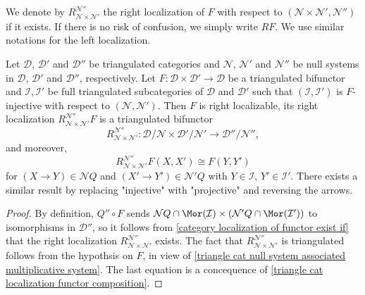 We denote by $R_{\mathcal{N}\times\mathcal{N}'}^{\mathcal{N}''}$ the right localization of $F$ with respect to $(\mathcal{N}\times\mathcal{N}',\mathcal{N}'')$ if it exists. If there is no risk of confusion, we simply write $RF$. We use similar notations for the left localization.

\begin{proposition}\label{triangle cat localization bifunctor exists if}
Let $\mathcal{D}$, $\mathcal{D}'$ and $\mathcal{D}''$ be triangulated categories and $\mathcal{N}$, $\mathcal{N}'$ and $\mathcal{N}''$ be null systems in $\mathcal{D}$, $\mathcal{D}'$ and $\mathcal{D}''$, respectively. Let $F:\mathcal{D}\times\mathcal{D}'\to\mathcal{D}$ be a triangulated bifunctor and $\mathcal{I},\mathcal{I}'$ be full triangulated subcategories of $\mathcal{D}$ and $\mathcal{D}'$ such that $(\mathcal{I},\mathcal{I}')$ is $F$-injective with respect to $(\mathcal{N},\mathcal{N}')$. Then $F$ is right localizable, its right localization $R_{\mathcal{N}\times\mathcal{N}'}^{\mathcal{N}''}F$ is a triangulated bifunctor 
\[R_{\mathcal{N}\times\mathcal{N}'}^{\mathcal{N}''}:\mathcal{D}/\mathcal{N}\times\mathcal{D}'/\mathcal{N}'\to\mathcal{D}''/\mathcal{N}'',\]
and moreover,
\begin{equation}\label{triangle cat localization bifunctor exists if-1}
R_{\mathcal{N}\times\mathcal{N}'}^{\mathcal{N}''}F(X,X')\cong F(Y,Y')
\end{equation}
for $(X\to Y)\in\mathcal{N}Q$ and $(X'\to Y')\in\mathcal{N}'Q$ with $Y\in\mathcal{I}$, $Y'\in\mathcal{I}'$. There exists a similar result by replacing "injective" with "projective" and reversing the arrows.
\end{proposition}
\begin{proof}
By definition, $Q''\circ F$ sends $\mathcal{N}Q\cap\Mor(\mathcal{I})\times(\mathcal{N}'Q\cap\Mor(\mathcal{I}'))$ to isomorphisms in $\mathcal{D}''$, so it follows from \cref{category localization of functor exist if} that the right localization $R_{\mathcal{N}\times\mathcal{N}'}^{\mathcal{N}''}$ exists. The fact that $R_{\mathcal{N}\times\mathcal{N}'}^{\mathcal{N}''}$ is triangulated follows from the hypothsis on $F$, in view of \cref{triangle cat null system associated multiplicative system}. The last equation is a concequence of \cref{triangle cat localization functor composition}.
\end{proof}

